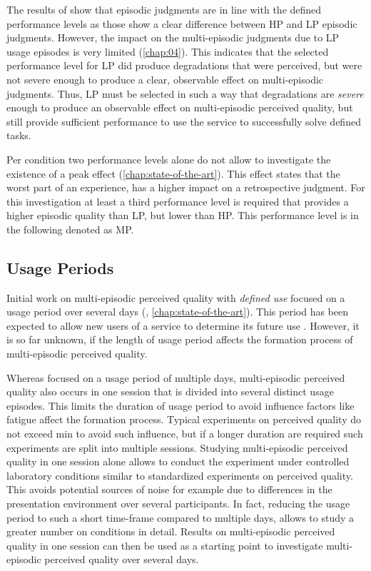 The results of \cite{moller_single-call_2011} show that episodic judgments are in line with the defined performance levels as those show a clear difference between \ac{HP} and \ac{LP} episodic judgments.
However, the impact on the multi-episodic judgments due to \ac{LP} usage episodes is very limited (\cf \autoref{chap:04}).
This indicates that the selected performance level for \ac{LP} did produce degradations that were perceived, but were not severe enough to produce a clear, observable effect on multi-episodic judgments.
Thus, \ac{LP} must be selected in such a way that degradations are \emph{severe} enough to produce an observable effect on multi-episodic perceived quality, but still provide sufficient performance to use the service to successfully solve defined tasks.

Per condition two performance levels alone do not allow to investigate the existence of a peak effect (\cf \autoref{chap:state-of-the-art}).
This effect states that the worst part of an experience, has a higher impact on a retrospective judgment.
For this investigation at least a third performance level is required that provides a higher episodic quality than \ac{LP}, but lower than \ac{HP}.
This performance level is in the following denoted as \acf{MP}.

\subsection{Usage Periods}
Initial work on multi-episodic perceived quality with \emph{defined use} focused on a usage period over several days (\cf, \autoref{chap:state-of-the-art}). 
This period has been expected to allow new users of a service to determine its future use \citep[\cf,][]{moller_single-call_2011}.
However, it is so far unknown, if the length of usage period affects the formation process of multi-episodic perceived quality.

Whereas \cite{moller_single-call_2011} focused on a usage period of multiple days, multi-episodic perceived quality also occurs in one session that is divided into several distinct usage episodes.
This limits the duration of usage period to avoid influence factors like fatigue affect the formation process.
Typical experiments on perceived quality do not exceed \unit[90]{min} to avoid such influence, but if a longer duration are required such experiments are split into multiple sessions.
Studying multi-episodic perceived quality in one session alone allows to conduct the experiment under controlled laboratory conditions similar to standardized experiments on perceived quality.
This avoids potential sources of noise for example due to differences in the presentation environment over several participants.
In fact, reducing the usage period to such a short time-frame compared to multiple days, allows to study a greater number on conditions in detail.
Results on multi-episodic perceived quality in one session can then be used as a starting point to investigate multi-episodic perceived quality over several days.

